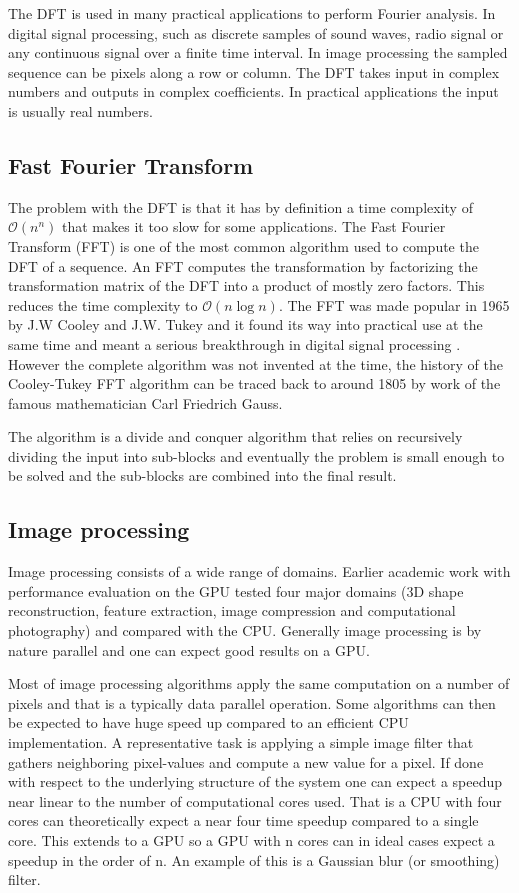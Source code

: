 The DFT is used in many practical applications to perform Fourier analysis. In digital signal processing, such as discrete samples of sound waves, radio signal or any continuous signal over a finite time interval. In image processing the sampled sequence can be pixels along a row or column. The DFT takes input in complex numbers and outputs in complex coefficients. In practical applications the input is usually real numbers.

\subsection{Fast Fourier Transform}
The problem with the DFT is that it has by definition a time complexity of $\mathcal{O}(n^n)$ that makes it too slow for some applications. The Fast Fourier Transform (FFT) is one of the most common algorithm used to compute the DFT of a sequence. An FFT computes the transformation by factorizing the transformation matrix of the DFT into a product of mostly zero factors. This reduces the time complexity to $\mathcal{O}(n\log{}n)$.
The FFT was made popular in 1965 by J.W Cooley and J.W. Tukey and it found its way into practical use at the same time and meant a serious breakthrough in digital signal processing \cite{Cooley1969, Brigham1967}. However the complete algorithm was not invented at the time, the history of the Cooley-Tukey FFT algorithm can be traced back to around 1805 by work of the famous mathematician Carl Friedrich Gauss\cite{Heideman1985}.

The algorithm is a divide and conquer algorithm that relies on recursively dividing the input into sub-blocks and eventually the problem is small enough to be solved and the sub-blocks are combined into the final result.
\subsection{Image processing}
Image processing consists of a wide range of domains. Earlier academic work with performance evaluation on the GPU\cite{Park2011} tested four major domains (3D shape reconstruction, feature extraction, image compression and computational photography) and compared with the CPU. Generally image processing is by nature parallel and one can expect good results on a GPU.

Most of image processing algorithms apply the same computation on a number of pixels and that is a typically data parallel operation. Some algorithms can then be expected to have huge speed up compared to an efficient CPU implementation. A representative task is applying a simple image filter that gathers neighboring pixel-values and compute a new value for a pixel. If done with respect to the underlying structure of the system one can expect a speedup near linear to the number of computational cores used. That is a CPU with four cores can theoretically expect a near four time speedup compared to a single core. This extends to a GPU so a GPU with n cores can in ideal cases expect a speedup in the order of n. An example of this is a Gaussian blur (or smoothing) filter.


